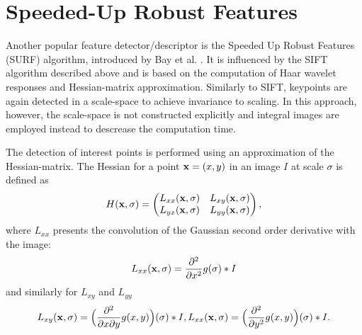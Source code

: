 \section{Speeded-Up Robust Features}

Another popular feature detector/descriptor is the Speeded Up Robust Features (SURF) algorithm, introduced by Bay et al. \cite{surf2006}. 
It is influenced by the SIFT algorithm described above and is based on the computation of Haar wavelet responses and Hessian-matrix approximation. 
Similarly to SIFT, keypoints are again detected in a scale-space to achieve invariance to scaling. 
In this approach, however, the scale-space is not constructed explicitly and integral images are employed instead to descrease the computation time. %

The detection of interest points is performed using an approximation of the Hessian-matrix.
The Hessian for a point $\mathbf{x} = (x, y)$ in an image $I$ at scale $\sigma$ is defined as
$$H(\mathbf{x}, \sigma) = \begin{pmatrix} 
L_{xx}(\mathbf{x}, \sigma) & L_{xy}(\mathbf{x}, \sigma) \\ 
L_{yx}(\mathbf{x}, \sigma) & L_{yy}(\mathbf{x}, \sigma)
\end{pmatrix},$$
where $L_{xx}$ presents the convolution of the Gaussian second order derivative with the image:
\[
L_{xx}(\mathbf{x}, \sigma) = \frac{\partial ^{2}}{\partial x^{2}}g(\sigma) * I
\]
and similarly for $L_{xy}$ and $L_{yy}$
\[
L_{xy}(\mathbf{x}, \sigma) = \Big(\frac{\partial ^{2}}{\partial x \partial y}g(x, y)\Big)(\sigma) * I, 
L_{xx}(\mathbf{x}, \sigma) = \Big(\frac{\partial ^{2}}{\partial y^{2}}g(x, y)\Big)(\sigma) * I.
\]

